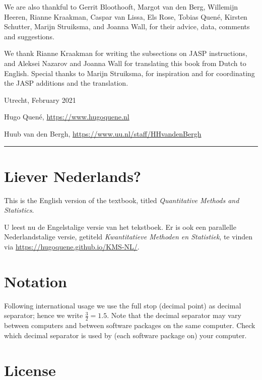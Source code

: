 \documentclass[
]{book}
\begin{document}
We are also thankful to
Gerrit Bloothooft,
Margot van den Berg,
Willemijn Heeren,
Rianne Kraakman,
Caspar van Lissa,
Els Rose,
Tobias Quené,
Kirsten Schutter,
Marijn Struiksma,
and Joanna Wall,
for their advice, data, comments and suggestions.

We thank Rianne Kraakman for writing the subsections on JASP instructions, and Aleksei Nazarov and Joanna Wall for translating this book from Dutch to English. Special thanks to Marijn Struiksma, for inspiration and for coordinating the JASP additions and the translation.

Utrecht, February 2021

Hugo Quené, \url{https://www.hugoquene.nl}

Huub van den Bergh, \url{https://www.uu.nl/staff/HHvandenBergh}

\begin{center}\rule{0.5\linewidth}{0.5pt}\end{center}

\hypertarget{liever-nederlands}{%
\section*{Liever Nederlands?}\label{liever-nederlands}}

This is the English version of the textbook, titled \emph{Quantitative Methods and Statistics}.

U leest nu de Engelstalige versie van het tekstboek. Er is ook een parallelle Nederlandstalige versie, getiteld \emph{Kwantitatieve Methoden en Statistiek}, te vinden via \url{https://hugoquene.github.io/KMS-NL/}.

\hypertarget{notation}{%
\section*{Notation}\label{notation}}

Following international usage we use the full stop (decimal point) as decimal separator; hence we write \(\frac{3}{2}=1.5\). Note that the decimal separator may vary between computers and between software packages on the same computer. Check which decimal separator is used by (each software package on) your computer.

\hypertarget{license}{%
\section*{License}\label{license}}
\end{document}
